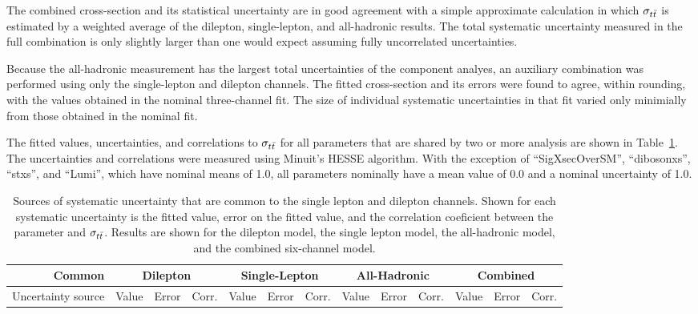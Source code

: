 The combined cross-section and its statistical uncertainty are in good agreement with a simple approximate calculation in which $\sigma_{t\bar{t}}$ is estimated by a weighted average of the dilepton, single-lepton, and all-hadronic results.
The total systematic uncertainty measured in the full combination is only slightly larger than one would expect assuming fully uncorrelated uncertainties. 

Because the all-hadronic measurement has the largest total uncertainties of the component analyes, an auxiliary combination was performed using only the single-lepton and dilepton channels.
The fitted cross-section and its errors were found to agree, within rounding, with the values obtained in the nominal three-channel fit.
The size of individual systematic uncertainties in that fit varied only minimially from those obtained in the nominal fit.

The fitted values, uncertainties, and correlations to $\sigma_{ t\bar{t} }$ for all parameters that are shared by two or more analysis are shown in Table~\ref{tab:commonFittedParams}.
The uncertainties and correlations were measured using Minuit's HESSE algorithm.
With the exception of ``SigXsecOverSM'', ``dibosonxs'', ``stxs'', and ``Lumi'', which have nominal means of 1.0, all parameters nominally have a mean value of 0.0 and a nominal uncertainty of 1.0.


\begin{table}[htbp]

  \begin{center}  
    \tiny
    \begin{tabular}{|r|ccc|ccc|ccc|ccc|} 
      \hline
      Common & \multicolumn{3}{|c|}{Dilepton}  & \multicolumn{3}{|c|}{Single-Lepton} & \multicolumn{3}{|c|}{All-Hadronic} & \multicolumn{3}{|c|}{Combined} \\
      \hline
      Uncertainty source & Value & Error & Corr. & Value & Error & Corr. & Value & Error & Corr. & Value & Error & Corr. \\
      \hline
      
      \hline
    \end{tabular}
  \end{center}
  \caption{ \label{tab:commonFittedParams} Sources of systematic uncertainty that are common to the single lepton and dilepton channels.  Shown for each systematic uncertainty is the fitted value, error on the fitted value, and the correlation coeficient between the parameter and $\sigma_{t\bar{t}}$.  Results are shown for the dilepton model, the single lepton model, the all-hadronic model, and the combined six-channel model. }
\end{table}

